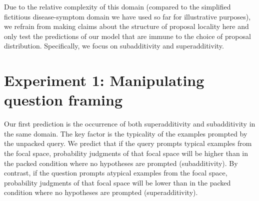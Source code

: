 Due to the relative complexity of this domain (compared to the simplified fictitious disease-symptom domain we have used so far for illustrative purposes), we refrain from making claims about the structure of proposal locality here and only test the predictions of our model that are immune to the choice of proposal distribution. Specifically, we focus on subadditivity and superadditivity.




\section{Experiment 1: Manipulating question framing}

Our first prediction is the occurrence of both superadditivity and subadditivity in the same domain. The key factor is the typicality of the examples prompted by the unpacked query. We predict that if the query prompts typical examples from the focal space, probability judgments of that focal space will be higher than in the packed condition where no hypotheses are prompted (subadditivity). By contrast, if the question prompts atypical examples from the focal space, probability judgments of that focal space will be lower than in the packed condition where no hypotheses are prompted (superadditivity).

